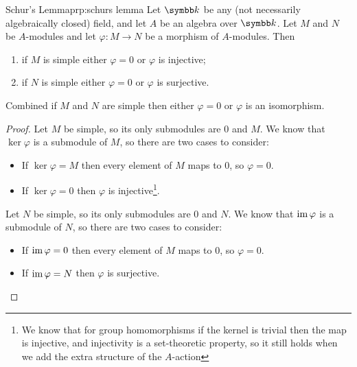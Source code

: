 \begin{prp}{Schur's Lemma}{prp:schurs lemma}
    Let \(\field\) be any (not necessarily algebraically closed) field, and let \(A\) be an algebra over \(\field\).
    Let \(M\) and \(N\) be \(A\)-modules and let \(\varphi \colon M \to N\) be a morphism of \(A\)-modules.
    Then
    \begin{enumerate}
        \item if \(M\) is simple either \(\varphi = 0\) or \(\varphi\) is injective;
        \item if \(N\) is simple either \(\varphi = 0\) or \(\varphi\) is surjective.
    \end{enumerate}
    Combined if \(M\) and \(N\) are simple then either \(\varphi = 0\) or \(\varphi\) is an isomorphism.
    \begin{proof}
        Let \(M\) be simple, so its only submodules are \(0\) and \(M\).
        We know that \(\ker \varphi\) is a submodule of \(M\), so there are two cases to consider:
        \begin{itemize}
            \item If \(\ker \varphi = M\) then every element of \(M\) maps to \(0\), so \(\varphi = 0\).
            \item If \(\ker \varphi = 0\) then \(\varphi\) is injective\footnote{We know that for group homomorphisms if the kernel is trivial then the map is injective, and injectivity is a set-theoretic property, so it still holds when we add the extra structure of the \(A\)-action}.
        \end{itemize}
        
        Let \(N\) be simple, so its only submodules are \(0\) and \(N\).
        We know that \(\operatorname{im} \varphi\) is a submodule of \(N\), so there are two cases to consider:
        \begin{itemize}
            \item If \(\operatorname{im} \varphi = 0\) then every element of \(M\) maps to \(0\), so \(\varphi = 0\).
            \item If \(\operatorname{im} \varphi = N\) then \(\varphi\) is surjective.
        \end{itemize}
    \end{proof}
\end{prp}

